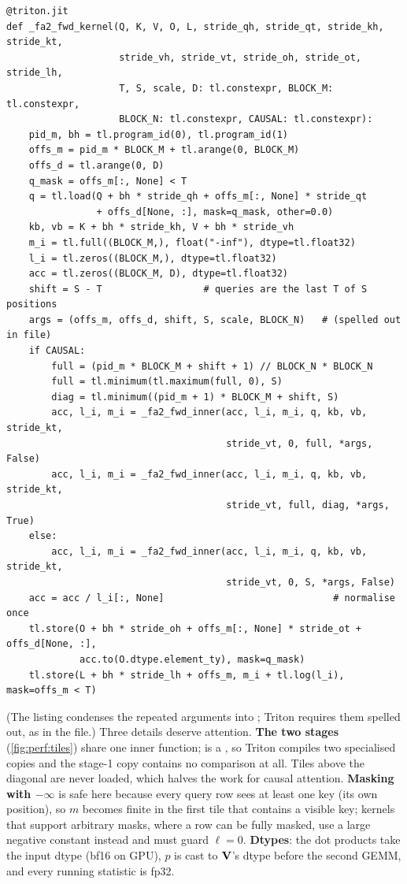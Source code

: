 \begin{lstlisting}[caption={FA2 forward: one program per (query tile, batch$\times$head), reflowed.},label={lst:perf:fa2fwd}]
@triton.jit
def _fa2_fwd_kernel(Q, K, V, O, L, stride_qh, stride_qt, stride_kh, stride_kt,
                    stride_vh, stride_vt, stride_oh, stride_ot, stride_lh,
                    T, S, scale, D: tl.constexpr, BLOCK_M: tl.constexpr,
                    BLOCK_N: tl.constexpr, CAUSAL: tl.constexpr):
    pid_m, bh = tl.program_id(0), tl.program_id(1)
    offs_m = pid_m * BLOCK_M + tl.arange(0, BLOCK_M)
    offs_d = tl.arange(0, D)
    q_mask = offs_m[:, None] < T
    q = tl.load(Q + bh * stride_qh + offs_m[:, None] * stride_qt
                + offs_d[None, :], mask=q_mask, other=0.0)
    kb, vb = K + bh * stride_kh, V + bh * stride_vh
    m_i = tl.full((BLOCK_M,), float("-inf"), dtype=tl.float32)
    l_i = tl.zeros((BLOCK_M,), dtype=tl.float32)
    acc = tl.zeros((BLOCK_M, D), dtype=tl.float32)
    shift = S - T                  # queries are the last T of S positions
    args = (offs_m, offs_d, shift, S, scale, BLOCK_N)   # (spelled out in file)
    if CAUSAL:
        full = (pid_m * BLOCK_M + shift + 1) // BLOCK_N * BLOCK_N
        full = tl.minimum(tl.maximum(full, 0), S)
        diag = tl.minimum((pid_m + 1) * BLOCK_M + shift, S)
        acc, l_i, m_i = _fa2_fwd_inner(acc, l_i, m_i, q, kb, vb, stride_kt,
                                       stride_vt, 0, full, *args, False)
        acc, l_i, m_i = _fa2_fwd_inner(acc, l_i, m_i, q, kb, vb, stride_kt,
                                       stride_vt, full, diag, *args, True)
    else:
        acc, l_i, m_i = _fa2_fwd_inner(acc, l_i, m_i, q, kb, vb, stride_kt,
                                       stride_vt, 0, S, *args, False)
    acc = acc / l_i[:, None]                              # normalise once
    tl.store(O + bh * stride_oh + offs_m[:, None] * stride_ot + offs_d[None, :],
             acc.to(O.dtype.element_ty), mask=q_mask)
    tl.store(L + bh * stride_lh + offs_m, m_i + tl.log(l_i), mask=offs_m < T)
\end{lstlisting}

(The listing condenses the repeated arguments into ; Triton requires them spelled
out, as in the file.) Three details deserve attention. \textbf{The two stages} (\cref{fig:perf:tiles}) share one inner
function;  is a , so Triton compiles two specialised copies and
the stage-1 copy contains no comparison at all. Tiles above the diagonal are never loaded, which
halves the work for causal attention. \textbf{Masking with $-\infty$} is safe here because every
query row sees at least one key (its own position), so $m$ becomes finite in the first tile that
contains a visible key; kernels that support arbitrary masks, where a row can be fully masked, use a
large negative constant instead and must guard $\ell=0$. \textbf{Dtypes}: the dot products take the
input dtype (bf16 on GPU), $p$ is cast to $\mathbf{V}$'s dtype before the second GEMM, and every
running statistic is fp32.

